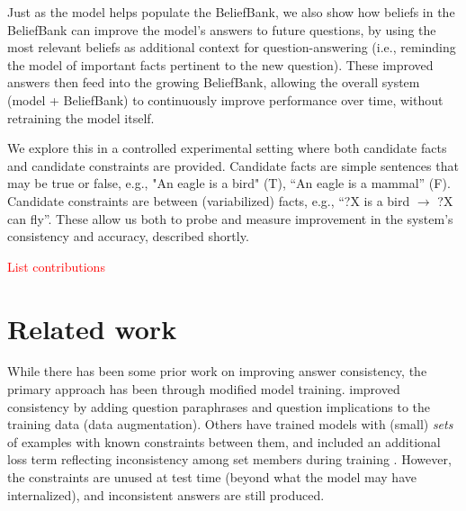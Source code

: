\documentclass[11pt]{article}
\newcommand{\eat}[1]{}
\newcommand{\red}[1]{\textcolor{red}{#1}}
\begin{document}
Just as the model helps populate the BeliefBank, we also show how beliefs in
the BeliefBank can improve the model's answers to future questions,
by using the most relevant beliefs as additional context for question-answering
(i.e., reminding the model of important facts pertinent to the new question).
These improved answers then feed into the growing BeliefBank, allowing the
overall system (model + BeliefBank) to continuously improve performance over
time, without retraining the model itself.

We explore this in a controlled experimental setting where 
both candidate facts and candidate constraints are provided. Candidate facts are simple
sentences that may be true or false, e.g., "An eagle is a bird" (T), ``An eagle is a mammal'' (F). Candidate constraints are between (variabilized) facts, e.g., ``?X is a bird $\rightarrow$ ?X can fly''. These allow us both to probe and measure improvement
in the system's consistency and accuracy, described shortly.

\eat{
\red{Delete/reword this paragraph} Our approach involves an interplay between a model's raw answers, and an
evolving memory - the BeliefBank - of beliefs based on the model's earlier answers
and a set of constraints that should hold. Model's answers contribute to the BeliefBank,
and the BeliefBank contribute new context to help with future question-answering by
the model. In between, a constraint system serves to identify and reduce inconsistency
among beliefs in the BeliefBank. Combined, this results in a system capable of
continuous improvement over time, opening new possibilities for dialog and
interactive teaching.
}

\red{List contributions}

\section{Related work}

While there has been some prior work on improving answer consistency, the primary approach
has been through modified model training. \citet{Ribeiro2019AreRR} improved consistency
by adding question paraphrases and question implications to the training data (data augmentation).
Others have trained models with (small) {\it sets} of examples with known constraints
between them, and included an additional loss term reflecting inconsistency among
set members during training \cite{Minervini2018AdversariallyRN,Li2019ALF,Asai2020LogicGuidedDA}.
However, the constraints are unused at test time (beyond what the model may have
internalized), and inconsistent answers are still produced.
\end{document}

